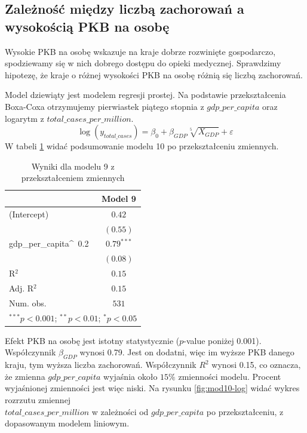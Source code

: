 \documentclass[12pt]{mwbk}
\theoremstyle{plain}
\theoremstyle{definition}
\theoremstyle{definition}
\begin{document}
\subsection{Zależność między liczbą zachorowań a wysokością PKB na osobę}

Wysokie PKB na osobę wskazuje na kraje dobrze rozwinięte gospodarczo, spodziewamy się w nich dobrego dostępu do opieki medycznej. Sprawdzimy hipotezę, że kraje o różnej wysokości PKB na osobę różnią się liczbą zachorowań.


Model dziewiąty jest modelem regresji prostej. Na podstawie przekształcenia Boxa-Coxa otrzymujemy pierwiastek piątego stopnia z $gdp\_per\_capita$ oraz logarytm z $total\_cases\_per\_million$.
$$\log(y_{total\_cases})=\beta_0+\beta_{GDP}\sqrt[5]{X_{GDP}}+\varepsilon$$
W tabeli \ref{table:mod10-log} widać podsumowanie modelu 10 po przekształceniu zmiennych.

\begin{table}[!htbp]
	\begin{center}
		\begin{tabular}{l c}
			\hline
			& Model 9 \\
			\hline
			(Intercept)          & $0.42$       \\
			& $(0.55)$     \\
			gdp\_per\_capita\^~0.2 & $0.79^{***}$ \\
			& $(0.08)$     \\
			\hline
			R$^2$                & $0.15$       \\
			Adj. R$^2$           & $0.15$       \\
			Num. obs.            & $531$        \\
			\hline
			\multicolumn{2}{l}{\scriptsize{$^{***}p<0.001$; $^{**}p<0.01$; $^{*}p<0.05$}}
		\end{tabular}
		\caption{Wyniki dla modelu 9 z przekształceniem zmiennych}
		\label{table:mod10-log}
	\end{center}
\end{table}

Efekt PKB na osobę jest istotny statystycznie ($p$-value poniżej 0.001). Współczynnik $\beta_{GDP}$ wynosi 0.79. Jest on dodatni, więc im wyższe PKB danego kraju, tym wyższa liczba zachorowań. Współczynnik $R^2$ wynosi 0.15, co oznacza, że zmienna $gdp\_per\_capita$ wyjaśnia około $15\%$ zmienności modelu. Procent wyjaśnionej zmienności jest więc niski. Na rysunku \ref{fig:mod10-log} widać wykres rozrzutu zmiennej \\$total\_cases\_per\_million$ w zależności od $gdp\_per\_capita$ po przekształceniu, z dopasowanym modelem liniowym.
\end{document}
